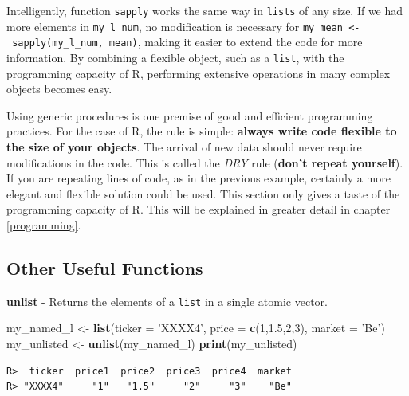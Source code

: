 \documentclass[
  12pt,
]{book}
\newenvironment{Shaded}{\begin{snugshade}}{\end{snugshade}}
\newcommand{\DataTypeTok}[1]{\textcolor[rgb]{0.27,0.27,0.27}{#1}}
\newcommand{\DecValTok}[1]{\textcolor[rgb]{0.06,0.06,0.06}{#1}}
\newcommand{\FloatTok}[1]{\textcolor[rgb]{0.06,0.06,0.06}{#1}}
\newcommand{\KeywordTok}[1]{\textcolor[rgb]{0.27,0.27,0.27}{\textbf{#1}}}
\newcommand{\NormalTok}[1]{#1}
\newcommand{\StringTok}[1]{\textcolor[rgb]{0.5,0.5,0.5}{#1}}
\begin{document}
Intelligently, function \texttt{sapply} works the same way in \texttt{lists} of any size. If we had more elements in \texttt{my\_l\_num}, no modification is necessary for \texttt{my\_mean\ \textless{}-\ sapply(my\_l\_num,\ mean)}, making it easier to extend the code for more information. By combining a flexible object, such as a \texttt{list}, with the programming capacity of R, performing extensive operations in many complex objects becomes easy.

Using generic procedures is one premise of good and efficient programming practices. For the case of R, the rule is simple: \textbf{always write code flexible to the size of your objects}. The arrival of new data should never require modifications in the code. This is called the \emph{DRY} rule (\textbf{don't repeat yourself}). If you are repeating lines of code, as in the previous example, certainly a more elegant and flexible solution could be used. This section only gives a taste of the programming capacity of R. This will be explained in greater detail in chapter \ref{programming}.

\hypertarget{other-useful-functions}{%
\subsection{Other Useful Functions}\label{other-useful-functions}}

\textbf{unlist} - Returns the elements of a \texttt{list} in a single atomic vector. 

\begin{Shaded}
\begin{Highlighting}[]
\NormalTok{my_named_l <-}\StringTok{ }\KeywordTok{list}\NormalTok{(}\DataTypeTok{ticker =} \StringTok{'XXXX4'}\NormalTok{,}
                   \DataTypeTok{price =} \KeywordTok{c}\NormalTok{(}\DecValTok{1}\NormalTok{,}\FloatTok{1.5}\NormalTok{,}\DecValTok{2}\NormalTok{,}\DecValTok{3}\NormalTok{),}
                   \DataTypeTok{market =} \StringTok{'Be'}\NormalTok{)}
\NormalTok{my_unlisted <-}\StringTok{ }\KeywordTok{unlist}\NormalTok{(my_named_l)}
\KeywordTok{print}\NormalTok{(my_unlisted)}
\end{Highlighting}
\end{Shaded}

\begin{verbatim}
R>  ticker  price1  price2  price3  price4  market 
R> "XXXX4"     "1"   "1.5"     "2"     "3"    "Be"
\end{verbatim}
\end{document}
